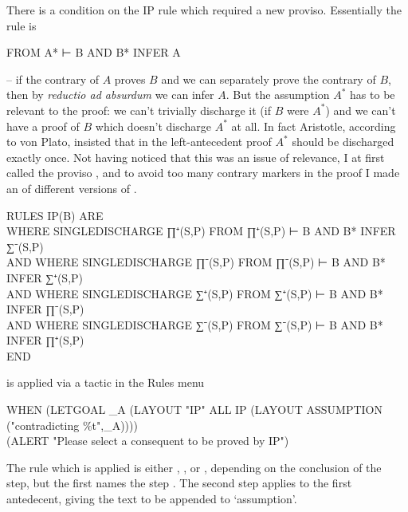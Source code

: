 There is a condition on the IP rule which required a new proviso. Essentially the rule is
\begin{japeish}
FROM A* ⊢ B AND B* INFER A
\end{japeish}
-- if the contrary of $A$ proves $B$ and we can separately prove the contrary of $B$, then by \emph{reductio ad absurdum} we can infer $A$. But the assumption $A^{*}$ has to be relevant to the proof: we can't trivially discharge it (if $B$ were $A^{*}$) and we can't have a proof of $B$ which doesn't discharge $A^{*}$ at all. In fact Aristotle, according to von Plato, insisted that in the left-antecedent proof $A^{*}$ should be discharged exactly once. Not having noticed that this was an issue of relevance, I at first called the proviso , and to avoid too many contrary markers in the proof I made an  of different versions of .
\begin{japeish}
RULES IP(B) ARE \\
\tab\tab WHERE SINGLEDISCHARGE ∏⁺(S,P) FROM ∏⁺(S,P) ⊢ B AND B* INFER ∑⁻(S,P) \\ 
 AND WHERE SINGLEDISCHARGE ∏⁻(S,P) FROM ∏⁻(S,P) ⊢ B AND B* INFER ∑⁺(S,P)  \\
 AND WHERE SINGLEDISCHARGE ∑⁺(S,P) FROM ∑⁺(S,P) ⊢ B AND B* INFER ∏⁻(S,P)  \\
 AND WHERE SINGLEDISCHARGE ∑⁻(S,P) FROM ∑⁻(S,P) ⊢ B AND B* INFER ∏⁺(S,P) \\
END
\end{japeish}
 is applied via a tactic in the Rules menu
\begin{japeish}
WHEN (LETGOAL \_A (LAYOUT "IP" ALL IP (LAYOUT ASSUMPTION ("contradicting \%t",\_A)))) \\
\tab\tab\tab                  (ALERT "Please select a consequent to be proved by IP") \\
\end{japeish}
The rule which is applied is either , ,  or , depending on the conclusion of the step, but the first  names the step . The second step applies  to the first antedecent, giving the text to be appended to `assumption'.

